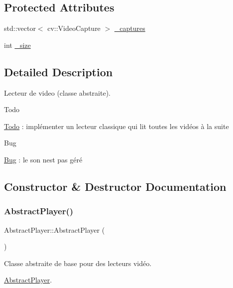\subsection*{Protected Attributes}
\begin{DoxyCompactItemize}
\item 
std\+::vector$<$ cv\+::\+Video\+Capture $>$ \hyperlink{classAbstractPlayer_a72dd2ef25310decd45671a7d51e1f319}{\+\_\+captures}
\item 
int \hyperlink{classAbstractPlayer_a9d8395a141cc985622d4910209bc7d53}{\+\_\+size}
\end{DoxyCompactItemize}


\subsection{Detailed Description}
Lecteur de video (classe abstraite). \begin{DoxyRefDesc}{Todo}
\item[\hyperlink{todo__todo000001}{Todo}]\+: implémenter un lecteur classique qui lit toutes les vidéos à la suite \end{DoxyRefDesc}
\begin{DoxyRefDesc}{Bug}
\item[\hyperlink{bug__bug000001}{Bug}]\+: le son n\textquotesingle{}est pas géré \end{DoxyRefDesc}


\subsection{Constructor \& Destructor Documentation}
\mbox{\label{classAbstractPlayer_a4987602a4b3381a9c592585dde7cf33b}} 
\subsubsection{\texorpdfstring{Abstract\+Player()}{AbstractPlayer()}}
{\footnotesize\ttfamily Abstract\+Player\+::\+Abstract\+Player (\begin{DoxyParamCaption}{ }\end{DoxyParamCaption})}



Classe abstraite de base pour des lecteurs vidéo. 

\hyperlink{classAbstractPlayer}{Abstract\+Player}. 

